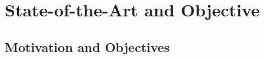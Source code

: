 \documentclass{erc-B2}
\begin{document}


\maketitle
%

\section{State-of-the-Art and Objective}
 \subsection{Motivation and Objectives}


\end{document}

